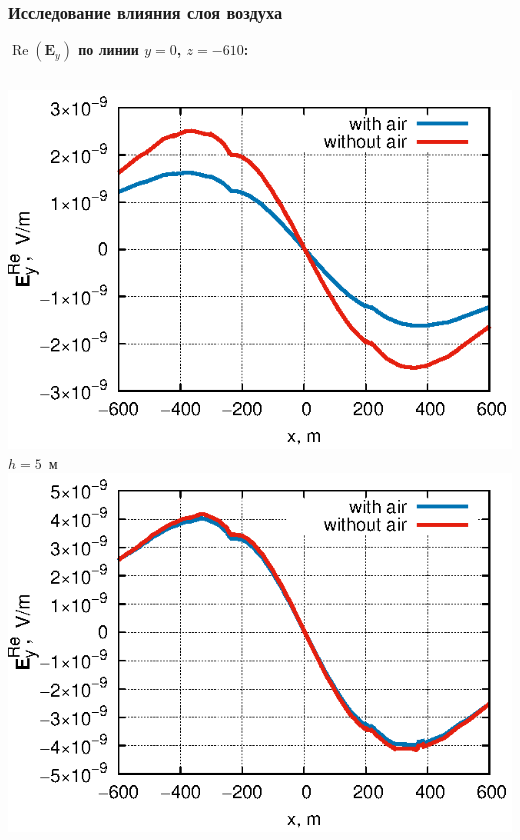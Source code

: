 \documentclass[aspectratio=43]{beamer}
\renewcommand{\Re}{\mathop{\mathrm{Re}}\nolimits}
\newcommand{\MakeTitle}[1]{\frametitle{\hspace{1.5em}\textbf{#1} \hfill \insertframenumber{} }}
\begin{document}
\begin{frame}
	\MakeTitle{Исследование влияния слоя воздуха}
	\textbf{$\Re(\mathbf{E}_y)$ по линии $y=0$, $z=-610$:}
	\begin{columns}[t,totalwidth=\linewidth]
		\begin{column}{.5\linewidth}
			\vspace{-1.7em}
			\begin{center}
			\includegraphics[width=\textwidth,height=0.4\textheight,keepaspectratio]{deep_-5.eps} \\
			\vspace{-0.1em}
			\tiny{$h=5$~м} \\
			\includegraphics[width=\textwidth,height=0.4\textheight,keepaspectratio]{deep_-200.eps} \\
			\vspace{-0.1em}

\end{center}
\end{column}
\end{columns}
\end{frame}
\end{document}
